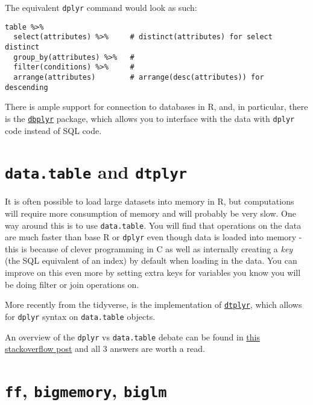 \documentclass[
]{book}
\begin{document}
The equivalent \texttt{dplyr} command would look as such:

\begin{verbatim}
table %>%
  select(attributes) %>%     # distinct(attributes) for select distinct
  group_by(attributes) %>%   # 
  filter(conditions) %>%     # 
  arrange(attributes)        # arrange(desc(attributes)) for descending
\end{verbatim}

There is ample support for connection to databases in R, and, in particular, there is the \href{https://dbplyr.tidyverse.org}{\texttt{dbplyr}} package, which allows you to interface with the data with \texttt{dplyr} code instead of SQL code.

\hypertarget{data.table-and-dtplyr}{%
\section{\texorpdfstring{\texttt{data.table} and \texttt{dtplyr}}{data.table and dtplyr}}\label{data.table-and-dtplyr}}

It is often possible to load large datasets into memory in R, but computations will require more consumption of memory and will probably be very slow. One way around this is to use \texttt{data.table}. You will find that operations on the data are much faster than base R or \texttt{dplyr} even though data is loaded into memory - this is because of clever programming in C as well as internally creating a \emph{key} (the SQL equivalent of an index) by default when loading in the data. You can improve on this even more by setting extra keys for variables you know you will be doing filter or join operations on.

More recently from the tidyverse, is the implementation of \href{https://dtplyr.tidyverse.org}{\texttt{dtplyr}}, which allows for \texttt{dplyr} syntax on \texttt{data.table} objects.

An overview of the \texttt{dplyr} vs \texttt{data.table} debate can be found in \href{https://stackoverflow.com/questions/21435339/data-table-vs-dplyr-can-one-do-something-well-the-other-cant-or-does-poorly/27840349\#27840349}{this stackoverflow post} and all 3 answers are worth a read.

\hypertarget{ff-bigmemory-biglm}{%
\section{\texorpdfstring{\texttt{ff}, \texttt{bigmemory}, \texttt{biglm}}{ff, bigmemory, biglm}}\label{ff-bigmemory-biglm}}
\end{document}
